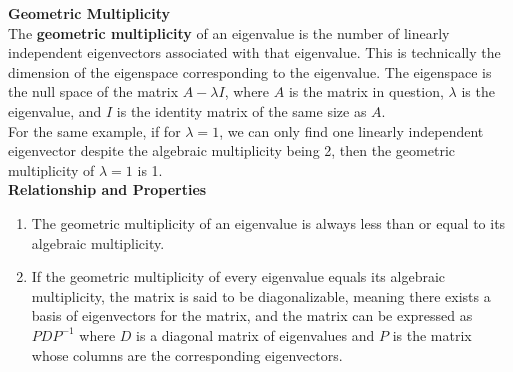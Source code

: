 {    \textbf{Geometric Multiplicity} \\
    The \textbf{geometric multiplicity} of an eigenvalue is the number of linearly independent eigenvectors associated with that eigenvalue. This is technically the dimension of the eigenspace corresponding to the eigenvalue. The eigenspace is the null space of the matrix $A - \lambda I$, where $A$ is the matrix in question, $\lambda$ is the eigenvalue, and $I$ is the identity matrix of the same size as $A$. \\

    For the same example, if for $\lambda = 1$, we can only find one linearly independent eigenvector despite the algebraic multiplicity being 2, then the geometric multiplicity of $\lambda = 1$ is 1. \\

    \textbf{Relationship and Properties} 
    \begin{enumerate}
        \item The geometric multiplicity of an eigenvalue is always less than or equal to its algebraic multiplicity.
        \item If the geometric multiplicity of every eigenvalue equals its algebraic multiplicity, the matrix is said to be diagonalizable, meaning there exists a basis of eigenvectors for the matrix, and the matrix can be expressed as $PDP^{-1}$ where $D$ is a diagonal matrix of eigenvalues and $P$ is the matrix whose columns are the corresponding eigenvectors.
    \end{enumerate}
}




